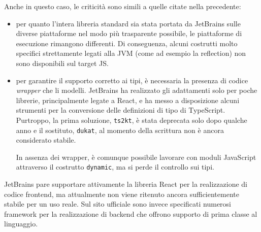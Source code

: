      Anche in questo caso, le criticità sono simili a quelle citate nella  precedente:
      \begin{itemize}
        \item
          per quanto l'intera libreria standard sia stata portata da JetBrains sulle diverse piattaforme nel modo più trasparente possibile, le piattaforme di esecuzione rimangono differenti.
          Di conseguenza, alcuni costrutti molto specifici strettamente legati alla JVM (come ad esempio la reflection) non sono disponibili sul target JS\@.
        \item
          per garantire il supporto corretto ai tipi, è necessaria la presenza di codice \emph{wrapper} che li modelli.
          JetBrains ha realizzato gli adattamenti solo per poche librerie, principalmente legate a React, e ha messo a disposizione alcuni strumenti per la conversione delle definizioni di tipo di TypeScript.
          Purtroppo, la prima soluzione, \texttt{ts2kt}, è stata deprecata solo dopo qualche anno e il sostituto, \texttt{dukat}, al momento della scrittura non è ancora considerato stabile.

          In assenza dei wrapper, è comunque possibile lavorare con moduli JavaScript attraverso il costrutto \texttt{dynamic}, ma si perde il controllo sui tipi.
      \end{itemize}

      JetBrains pare supportare attivamente la libreria React per la realizzazione di codice frontend, ma attualmente non viene ritenuto ancora sufficientemente stabile per un uso reale.
      Sul sito ufficiale sono invece specificati numerosi framework per la realizzazione di backend che offrono supporto di prima classe al linguaggio.
